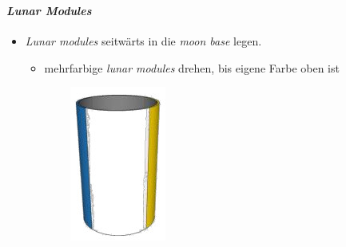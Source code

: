 \begin{frame}
	\frametitle{\eurobot}
	\framesubtitle{\textit{Lunar Modules}}
	
	\begin{itemize}
		\item \textit{Lunar modules} seitwärts in die \textit{moon base} legen.
		\begin{itemize}
			\item mehrfarbige \textit{lunar modules} drehen, bis eigene Farbe oben ist
		\end{itemize}
	\end{itemize}

	\begin{figure}
		\begin{subfigure}{0.1\textwidth}
			\includegraphics[width=\textwidth]{../images/lunarModuleMulticolor.jpg}

\end{subfigure}
\end{figure}
\end{frame}
